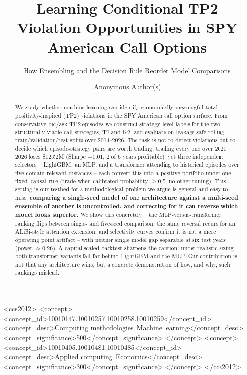 \documentclass[sigconf,review,anonymous]{acmart}
\begin{document}
\title{Learning Conditional TP2 Violation Opportunities in SPY American Call Options}
\subtitle{How Ensembling and the Decision Rule Reorder Model Comparisons}

\author{Anonymous Author(s)}

\renewcommand{\shortauthors}{Anonymous et al.}

\begin{abstract}
We study whether machine learning can identify economically meaningful total-positivity-inspired (TP2) violations in the SPY American call option surface. From conservative bid/ask TP2 episodes we construct strategy-level labels for the two structurally viable call strategies, T1 and K2, and evaluate on leakage-safe rolling train/validation/test splits over 2014--2026. The task is not to detect violations but to decide which episode-strategy pairs are worth trading: trading every one over 2021--2026 loses \$12.52M (Sharpe $-1.01$, 2 of 6 years profitable), yet three independent selectors -- LightGBM, an MLP, and a transformer attending to historical episodes over five domain-relevant distances -- each convert this into a positive portfolio under one fixed, causal rule (trade when calibrated probability $\ge 0.5$, no other tuning). This setting is our testbed for a methodological problem we argue is general and easy to miss: \textbf{comparing a single-seed model of one architecture against a multi-seed ensemble of another is uncontrolled, and correcting for it can reverse which model looks superior.} We show this concretely -- the MLP-versus-transformer ranking flips between single- and five-seed comparison, the same reversal recurs for an ALiBi-style attention extension, and selectivity curves confirm it is not a mere operating-point artifact -- with neither single-model gap separable at six test years (power $\approx0.26$). A capital-scaled backtest sharpens the caution: under realistic sizing both transformer variants fall far behind LightGBM and the MLP. Our contribution is not that any architecture wins, but a concrete demonstration of how, and why, such rankings mislead.
\end{abstract}

\begin{CCSXML}
<ccs2012>
 <concept>
  <concept_id>10010147.10010257.10010258.10010259</concept_id>
  <concept_desc>Computing methodologies~Machine learning</concept_desc>
  <concept_significance>500</concept_significance>
 </concept>
 <concept>
  <concept_id>10010405.10010481.10010485</concept_id>
  <concept_desc>Applied computing~Economics</concept_desc>
  <concept_significance>300</concept_significance>
 </concept>
</ccs2012>
\end{CCSXML}
\end{document}
